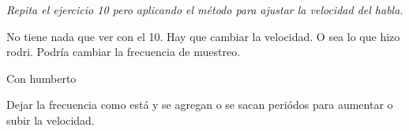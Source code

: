


\emph{Repita el ejercicio 10 pero aplicando el método para ajustar la velocidad del habla.}



No tiene nada que ver con el 10. Hay que cambiar la velocidad. O sea lo que hizo rodri. Podría cambiar la frecuencia de muestreo.


Con humberto

Dejar la frecuencia como está y se agregan o se sacan periódos para aumentar o subir la velocidad.
